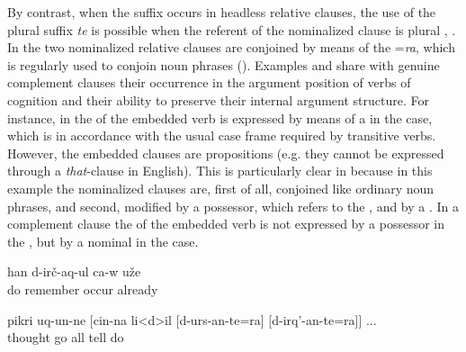 By contrast, when the suffix occurs in headless relative clauses, the use of the plural suffix \textit{te} is possible when the referent of the nominalized clause is plural , . In  the two nominalized relative clauses are conjoined by means of the  =\textit{ra}, which is regularly used to conjoin noun phrases (). Examples  and  share with genuine complement clauses their occurrence in the argument position of verbs of cognition and their ability to preserve their internal argument structure. For instance, in  the  of the embedded verb is expressed by means of a  in the  case, which is in accordance with the usual case frame required by transitive verbs. However, the embedded clauses are propositions (e.g. they cannot be expressed through a \textit{that}-clause in English). This is particularly clear in   because in this example the nominalized clauses are, first of all, conjoined like ordinary noun phrases, and second, modified by a possessor, which refers to the , and by a . In a complement clause the  of the embedded verb is not expressed by a possessor in the , but by a nominal in the  case. 


%
\begin{exe}
	\ex	\label{ex:He remembered what he had done attributive markers}
		han	d-irč-aq-ul	ca-w	uže\\
			do remember	occur		already\\
	\glt	{}

	\ex	\label{ex:‎‎and thought of what he had said and done}
	\gll	pikri	uq-un-ne	[cin-na	li<d>il	[d-urs-an-te=ra]	[d-irq'-an-te=ra]] ...\\
		thought	go		all	tell	do\\
	\glt	{}
\end{exe}

